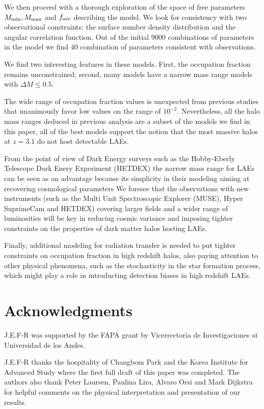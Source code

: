 \documentclass{emulateapj}
\newcommand{\ly}{{\ifmmode{{\rm Ly}\alpha}\else{Ly$\alpha$~}\fi}}
\begin{document}
We then proceed with a thorough exploration of the space of free
parameters $M_{\rm min}, M_{\rm max}$ and $f_{\rm occ}$ describing the
model. We look for consistency with two observational constraints: the
surface number density distribution and the angular correlation
function. Out of the initial $9000$  combinations of parameters in the
model we find $40$ combination of parameters consistent with
observations. 

We find two interesting features in these models. First, the
occupation fraction remains unconstrained; second, many models have a
narrow mass range models with $\Delta M \leq 0.5$.  

The wide range of occupation fraction values is unexpected from
previous studies \citep[i.e.][]{Gawiser2007,Ouchi2010}  that
unanimously favor low values on the range of $10^{-2}$. Nevertheless,
all the halo mass ranges deduced in previous analysis are a subset of
the models we find in this paper, all of the best models support the
notion that the most massive halos at $z=3.1$ do not host detectable
LAEs.   

  From the point of view of Dark Energy surveys such as the Hobby-Eberly
  Telescope Dark Enery Experiment (HETDEX) the
  narrow mass range for LAEs can be seen as an advantage because its
  simplicity in their modeling aiming at recovering cosmological
  parameters We foresee that the observations with new instruments
(such as the Multi Unit Spectroscopic Explorer (MUSE), Hyper
SuprimeCam and HETDEX) covering larger fields and a wider range of
luminosities will be key in reducing cosmic variance and imposing
tighter constraints on the properties of dark matter halos hosting
LAEs. 

Finally, additional modeling for \ly radiation transfer is needed to
put tighter constraints on  occupation fraction in high redshift
halos, also paying attention to other physical phenomena, such as the
stochasticity \citep{ForeroRomero2013} in the star formation process,
which might play a role in introducting detection biases in high redshift
LAEs.


\section*{Acknowledgments} 

J.E.F-R was supported by the FAPA grant by Vicerrector\'ia de
Investigaciones at Universidad de los Andes.  

J.E.F-R thanks the hospitality of Changbom Park and the Korea
Institute for Advanced Study where the first full draft of this paper
was completed. The authors also thank Peter Laursen, Paulina Lira, 
Alvaro Orsi and Mark Dijkstra for helpful comments on the physical
interpretation and presentation of our results. 
\end{document}
